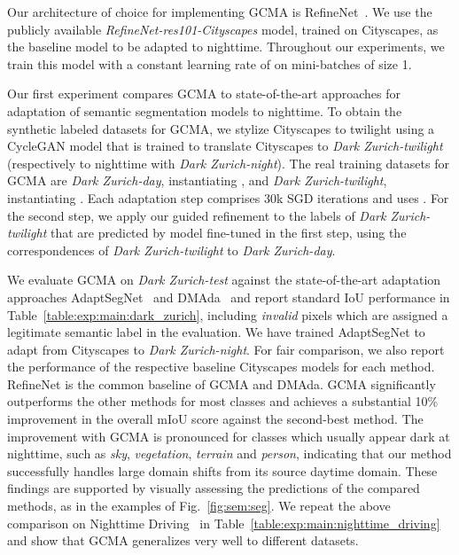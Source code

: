 \documentclass[10pt,twocolumn,letterpaper]{article}
\newcommand{\PAR}[1]{\vskip4pt \noindent{\bf #1~}}
\begin{document}
Our architecture of choice for implementing GCMA is RefineNet~\cite{refinenet}. We use the publicly available \emph{RefineNet-res101-Cityscapes} model, trained on Cityscapes, as the baseline model to be adapted to nighttime. Throughout our experiments, we train this model with a constant learning rate of  on mini-batches of size 1.

\PAR{Comparison to Other Adaptation Methods.}
Our first experiment compares GCMA to state-of-the-art approaches for adaptation of semantic segmentation models to nighttime. To obtain the synthetic labeled datasets for GCMA, we stylize Cityscapes to twilight using a CycleGAN model that is trained to translate Cityscapes to \emph{Dark Zurich-twilight} (respectively to nighttime with \emph{Dark Zurich-night}). The real training datasets for GCMA are \emph{Dark Zurich-day}, instantiating , and \emph{Dark Zurich-twilight}, instantiating . Each adaptation step comprises 30k SGD iterations and uses . For the second step, we apply our guided refinement to the labels of \emph{Dark Zurich-twilight} that are predicted by model  fine-tuned in the first step, using the correspondences of \emph{Dark Zurich-twilight} to \emph{Dark Zurich-day}.

We evaluate GCMA on \emph{Dark Zurich-test} against the state-of-the-art adaptation approaches AdaptSegNet~\cite{adapt:structured:output:cvpr18} and DMAda~\cite{daytime:2:nighttime} and report standard IoU performance in Table~\ref{table:exp:main:dark_zurich}, including \emph{invalid} pixels which are assigned a legitimate semantic label in the evaluation. We have trained AdaptSegNet to adapt from Cityscapes to \emph{Dark Zurich-night}. For fair comparison, we also report the performance of the respective baseline Cityscapes models for each method. RefineNet is the common baseline of GCMA and DMAda. GCMA significantly outperforms the other methods for most classes and achieves a substantial 10\% improvement in the overall mIoU score against the second-best method. The improvement with GCMA is pronounced for classes which usually appear dark at nighttime, such as \emph{sky}, \emph{vegetation}, \emph{terrain} and \emph{person}, indicating that our method successfully handles large domain shifts from its source daytime domain. These findings are supported by visually assessing the predictions of the compared methods, as in the examples of Fig.~\ref{fig:sem:seg}. We repeat the above comparison on Nighttime Driving~\cite{daytime:2:nighttime} in Table~\ref{table:exp:main:nighttime_driving} and show that GCMA generalizes very well to different datasets.
\end{document}
